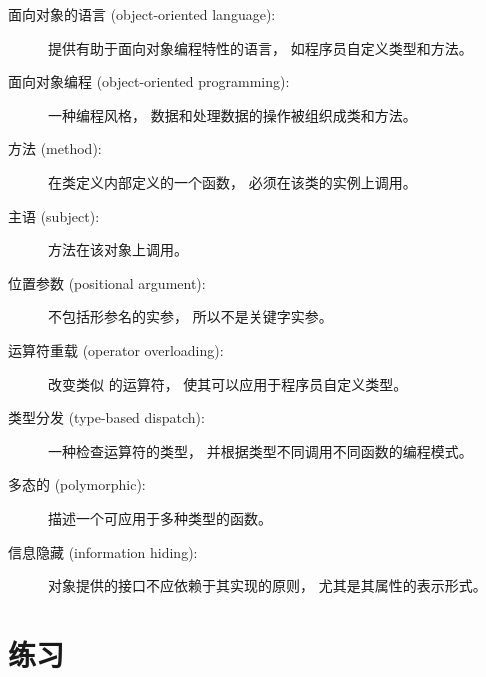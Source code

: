 \begin{description}

\item[面向对象的语言 (object-oriented language):] 提供有助于面向对象编程特性的语言， 如程序员自定义类型和方法。

\item[面向对象编程 (object-oriented programming):] 一种编程风格， 数据和处理数据的操作被组织成类和方法。

\item[方法 (method):] 在类定义内部定义的一个函数， 必须在该类的实例上调用。

\item[主语 (subject):] 方法在该对象上调用。

\item[位置参数 (positional argument):]  不包括形参名的实参， 所以不是关键字实参。
  

\item[运算符重载 (operator overloading):] 改变类似 \li{+} 的运算符，
使其可以应用于程序员自定义类型。
  

\item[类型分发 (type-based dispatch):] 一种检查运算符的类型， 并根据类型不同调用不同函数的编程模式。

\item[多态的 (polymorphic):] 描述一个可应用于多种类型的函数。

\item[信息隐藏 (information hiding):] 对象提供的接口不应依赖于其实现的原则， 尤其是其属性的表示形式。

\end{description}


\section{练习}


